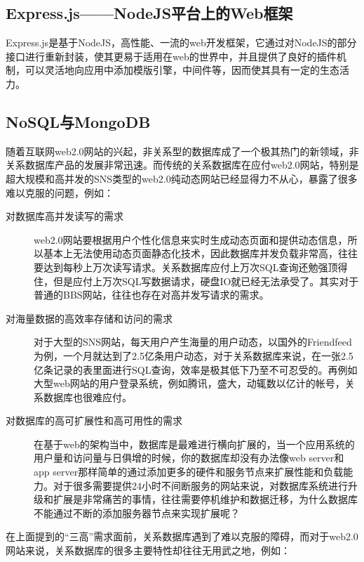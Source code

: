 \subsection{Express.js——NodeJS平台上的Web框架}
\indent
Express.js是基于NodeJS，高性能、一流的web开发框架，它通过对NodeJS的部分接口进行重新封装，使其更易于适用在web的世界中，并且提供了良好的插件机制，可以灵活地向应用中添加模版引擎，中间件等，因而使其具有一定的生态活力。

\subsection{NoSQL与MongoDB}
\indent
随着互联网web2.0网站的兴起，非关系型的数据库成了一个极其热门的新领域，非关系数据库产品的发展非常迅速。而传统的关系数据库在应付web2.0网站，特别是超大规模和高并发的SNS类型的web2.0纯动态网站已经显得力不从心，暴露了很多难以克服的问题，例如：

\begin{description}
    \item[对数据库高并发读写的需求] web2.0网站要根据用户个性化信息来实时生成动态页面和提供动态信息，所以基本上无法使用动态页面静态化技术，因此数据库并发负载非常高，往往要达到每秒上万次读写请求。关系数据库应付上万次SQL查询还勉强顶得住，但是应付上万次SQL写数据请求，硬盘IO就已经无法承受了。其实对于普通的BBS网站，往往也存在对高并发写请求的需求。
    \item[对海量数据的高效率存储和访问的需求] 对于大型的SNS网站，每天用户产生海量的用户动态，以国外的Friendfeed为例，一个月就达到了2.5亿条用户动态，对于关系数据库来说，在一张2.5亿条记录的表里面进行SQL查询，效率是极其低下乃至不可忍受的。再例如大型web网站的用户登录系统，例如腾讯，盛大，动辄数以亿计的帐号，关系数据库也很难应付。
    \item[对数据库的高可扩展性和高可用性的需求] 在基于web的架构当中，数据库是最难进行横向扩展的，当一个应用系统的用户量和访问量与日俱增的时候，你的数据库却没有办法像web server和app server那样简单的通过添加更多的硬件和服务节点来扩展性能和负载能力。对于很多需要提供24小时不间断服务的网站来说，对数据库系统进行升级和扩展是非常痛苦的事情，往往需要停机维护和数据迁移，为什么数据库不能通过不断的添加服务器节点来实现扩展呢？
\end{description}

\noindent
在上面提到的“三高”需求面前，关系数据库遇到了难以克服的障碍，而对于web2.0网站来说，关系数据库的很多主要特性却往往无用武之地，例如：

